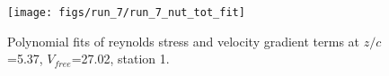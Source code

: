 \begin{figure}[H]
\centering
\texttt{[image: figs/run\_7/run\_7\_nut\_tot\_fit]}
\caption{Polynomial fits of reynolds stress and velocity gradient terms at $z/c$=5.37, $V_{free}$=27.02, station 1.}
\label{fig:run_7_nut_tot_fit}
\end{figure}


